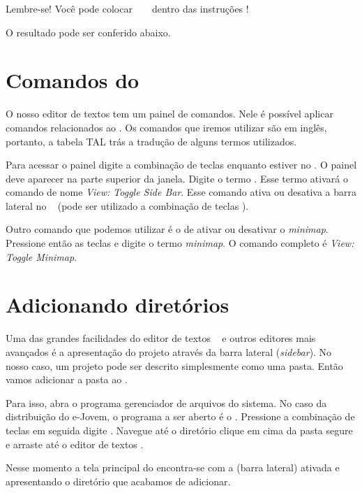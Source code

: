 

Lembre-se! Você pode colocar \tags~ \html~ dentro das instruções \php!

O resultado pode ser conferido abaixo.


\section{Comandos do \sublime}
\label{comandos-do-sublime}

O nosso editor de textos tem um painel de comandos. Nele é possível aplicar comandos
relacionados ao \sublime. Os comandos que iremos utilizar são em inglês, portanto,
a tabela TAL trás a tradução de alguns termos utilizados.

Para acessar o painel digite a combinação de teclas \ctrlshiftp enquanto estiver
no \sublime. O painel deve aparecer na parte superior da janela. Digite o termo
\sidebar. Esse termo ativará o comando de nome \textit{View: Toggle Side Bar}.
Esse comando ativa ou desativa a barra lateral no \sublime~ (pode ser utilizado
a combinação de teclas \sublimesidebar). 

Outro comando que podemos utilizar é o de ativar ou desativar o \textit{minimap}. 
Pressione então as teclas \ctrlshiftp e digite o termo \textit{minimap}. 
O comando completo é \textit{View: Toggle Minimap}.

\section{Adicionando diretórios}
\label{adicionando-diretorios}

Uma das grandes facilidades do editor de textos \sublime~ e outros editores mais
avançados é a apresentação do projeto através da barra lateral (\textit{sidebar}).
No nosso caso, um projeto pode ser descrito simplesmente como uma pasta. Então
vamos adicionar a pasta  ao \sublime. 

Para isso, abra o programa gerenciador de arquivos do sistema. No caso da 
distribuição do e-Jovem, o programa a ser aberto é o \thunar. Pressione a 
combinação de teclas \altfdois em seguida digite \thunar. Navegue até o 
diretório  clique em cima da pasta  
segure e arraste até o editor de textos \sublime.

Nesse momento a tela principal do \sublime encontra-se com a \sideb (barra lateral)
ativada e apresentando o diretório que acabamos de adicionar.

